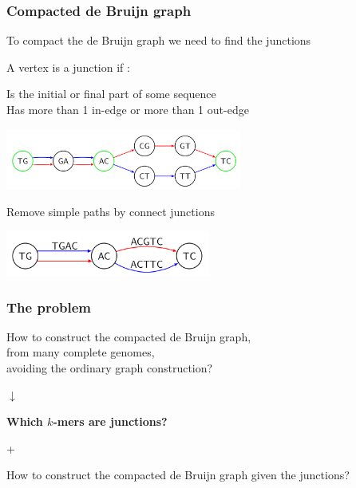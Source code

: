 \begin{frame}
	\frametitle{Compacted de Bruijn graph}
	\centering
	
  To compact the de Bruijn graph we need to find the junctions
  
  \medskip
  
  A vertex is a junction if :
  
  Is the initial or final part of some sequence\\
  Has more than 1 in-edge or more than 1 out-edge\\
	
	\medskip

	\includegraphics[height=2cm]{images/debruin-3a}

	\medskip

  Remove simple paths by connect junctions  	

	\medskip

	\includegraphics[height=1.5cm]{images/debruin-4}
	
\end{frame}




\begin{frame}
	\frametitle{The problem}
	\centering
	
	How to construct the compacted de Bruijn graph,\\ from many complete genomes,\\ avoiding the ordinary graph construction?
	
	\medskip
	
	$\downarrow$
	
	\medskip

  
  \textbf{Which $k$-mers are junctions?}
  
  \medskip
  
  +
  
  \medskip
  
  How to construct the compacted de Bruijn graph given the junctions?
  
	
\end{frame}
